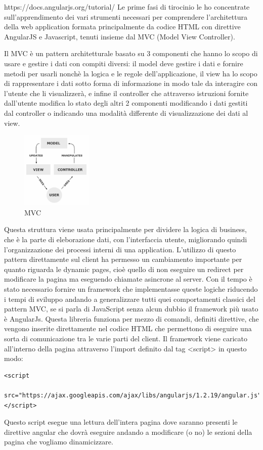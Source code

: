 https://docs.angularjs.org/tutorial/
\fi
Le prime fasi di tirocinio le ho concentrate sull'apprendimento dei vari strumenti necessari per comprendere l'architettura della web application formata principalmente da codice HTML con direttive AngularJS e Javascript, tenuti insieme dal MVC (Model View Controller).

Il MVC è un pattern architetturale basato su 3 componenti che hanno lo scopo di usare e gestire i dati con compiti diversi: il model deve gestire i dati e fornire metodi per usarli nonchè la logica e le regole dell'applicazione, il view ha lo scopo di rappresentare i dati sotto forma di informazione in modo tale da interagire con l'utente che li visualizzerà, e infine il controller che attraverso istruzioni fornite dall'utente modifica lo stato degli altri 2 componenti modificando i dati gestiti dal controller o indicando una modalità differente di visualizzazione dei dati al view.
\begin{figure}[H]
 \centering
  \includegraphics[width=0.3\textwidth]{img/MVC-Process.png}
 \caption{MVC}
 \end{figure}
Questa struttura viene usata principalmente per dividere la logica di business, che è la parte di eleborazione dati, con l'interfaccia utente, migliorando quindi l'organizzazione dei processi interni di una application.
L'utilizzo di questo pattern direttamente sul client ha permesso un cambiamento importante per quanto riguarda le dynamic pages, cioè quello di non eseguire un redirect per modificare la pagina ma eseguendo chiamate asincrone al server.
Con il tempo è stato necessario fornire un framework che implementasse queste logiche riducendo i tempi di sviluppo andando a generalizzare tutti quei comportamenti classici del pattern MVC, se si parla di JavaScript senza alcun dubbio il framework più usato è AngularJs.
Questa libreria funziona per mezzo di comandi, definiti direttive, che vengono inserite direttamente nel codice HTML che permettono di eseguire una sorta di comunicazione tra le varie parti del client. Il framework viene caricato all'interno della pagina attraverso l'import definito dal tag <script> in questo modo:
\begin{lstlisting}[language=betterHtml]
<script
 src="https://ajax.googleapis.com/ajax/libs/angularjs/1.2.19/angular.js">
</script>
\end{lstlisting}
Questo script esegue una lettura dell'intera pagina dove saranno presenti le direttive angular che dovrà eseguire andando a modificare (o no) le sezioni della pagina che vogliamo dinamicizzare.


